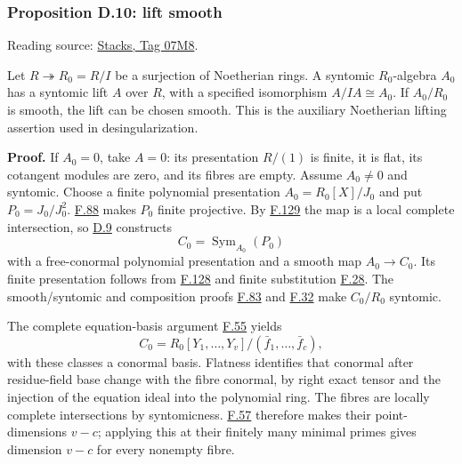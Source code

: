 \documentclass[11pt,a4paper,openany]{report}
\newcounter{none}
\begin{document}
\label{AG-RG-S05-smoothing-proposition-lift-smooth}

\subsubsection{Proposition D.10: lift smooth}\label{AG-RG-S05-proposition-d.10-lift-smooth}

Reading source: \href{https://stacks.math.columbia.edu/tag/07M8}{Stacks, Tag 07M8}.

Let \(R\twoheadrightarrow R_0=R/I\) be a surjection of Noetherian rings. A syntomic \(R_0\)-algebra \(A_0\) has a syntomic lift \(A\) over \(R\), with a specified isomorphism \(A/IA\cong A_0\). If \(A_0/R_0\) is smooth, the lift can be chosen smooth. This is the auxiliary Noetherian lifting assertion used in desingularization.

\textbf{Proof.} If \(A_0=0\), take \(A=0\): its presentation \(R/(1)\) is finite, it is flat, its cotangent modules are zero, and its fibres are empty. Assume \(A_0\ne0\) and syntomic. Choose a finite polynomial presentation \(A_0=R_0[X]/J_0\) and put \(P_0=J_0/J_0^2\). \hyperref[AG-RG-S05-algebra-lemma-syntomic-presentation-ideal-mod-squares]{F.88} makes \(P_0\) finite projective. By \hyperref[AG-RG-S05-more-algebra-lemma-syntomic-lci]{F.129} the map is a local complete intersection, so \hyperref[AG-RG-S05-smoothing-lemma-improve-presentation]{D.9} constructs \[C_0=\operatorname{Sym}_{A_0}(P_0)\] with a free-conormal polynomial presentation and a smooth map \(A_0\to C_0\). Its finite presentation follows from \hyperref[AG-RG-S05-more-algebra-lemma-symmetric-algebra-smooth]{F.128} and finite substitution \hyperref[AG-RG-S05-algebra-lemma-compose-finite-type]{F.28}. The smooth/syntomic and composition proofs \hyperref[AG-RG-S05-algebra-lemma-smooth-syntomic]{F.83} and \hyperref[AG-RG-S05-algebra-lemma-composition-syntomic]{F.32} make \(C_0/R_0\) syntomic.

The complete equation-basis argument \hyperref[AG-RG-S05-algebra-lemma-huber]{F.55} yields \[C_0=R_0[Y_1,\ldots,Y_v]/(\bar f_1,\ldots,\bar f_c),\] with these classes a conormal basis. Flatness identifies that conormal after residue-field base change with the fibre conormal, by right exact tensor and the injection of the equation ideal into the polynomial ring. The fibres are locally complete intersections by syntomicness. \hyperref[AG-RG-S05-algebra-lemma-lci]{F.57} therefore makes their point-dimensions \(v-c\); applying this at their finitely many minimal primes gives dimension \(v-c\) for every nonempty fibre.
\end{document}
